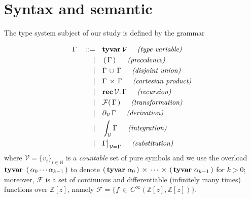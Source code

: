 \section{Syntax and semantic}

The type system subject of our study is defined by the grammar
\begin{definition}[Syntax]
\begin{displaymath}
\begin{split}
\Gamma\quad::=%
              \quad&\textbf{tyvar}\,\mathcal{V}\indent\textit{(type variable)} \\
             |\quad&\typarens{\Gamma}\indent\textit{(precedence)} \\
             |\quad&\tydu{\Gamma}{\Gamma}\indent\textit{(disjoint union)} \\
             |\quad&\tycp{\Gamma}{\Gamma}\indent\textit{(cartesian product)} \\
             |\quad&\tyrec{\mathcal{V}}{\Gamma}\indent\textit{(recursion)} \\
             |\quad&\mathcal{F}(\,\Gamma\,)\indent\textit{(transformation)} \\
             |\quad&\partial_{\mathcal{V}}\,{\Gamma}\indent\textit{(derivation)} \\
             |\quad&\int_{\mathcal{V}}{\Gamma}\indent\textit{(integration)} \\
             |\quad&\Gamma\big|_{\mathcal{V}=\Gamma}\indent\textit{(substitution)} \\
\end{split}
\end{displaymath}
where $\mathcal{V}=  \lbrace v_{i} \rbrace_{i\in\mathbb{N}}$ is a
\textit{countable} set of pure symbols and we use the overload
$\textbf{tyvar}\,\,\left(\,\alpha_{0}\cdots\alpha_{k-1}\,\right)$ to denote
$\left(\,\textbf{tyvar}\,\,\alpha_{0}\,\right)\,\times\,\cdots\,\times\,\left(\,\textbf{tyvar}\,\,\alpha_{k-1}\,\right)$
for $k>0$; moreover, $\mathcal{F}$ is a set of continuous and differentiable
    (infinitely many times) functions over $\mathbb{Z}[z]$, namely
    $\mathcal{F} = \lbrace f\,\in\,C^{\infty}(\mathbb{Z}[z],
    \mathbb{Z}[z])\rbrace$.
\end{definition}

